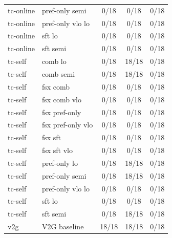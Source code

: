 \documentclass[10pt,landscape]{article}
\begin{document}
\begin{tabular}{llccc}
tc-online & pref-only semi & \cellcolor{missing}0/18 & \cellcolor{missing}0/18 & \cellcolor{missing}0/18 \\
tc-online & pref-only vlo lo & \cellcolor{missing}0/18 & \cellcolor{missing}0/18 & \cellcolor{missing}0/18 \\
tc-online & sft lo & \cellcolor{missing}0/18 & \cellcolor{missing}0/18 & \cellcolor{missing}0/18 \\
tc-online & sft semi & \cellcolor{missing}0/18 & \cellcolor{missing}0/18 & \cellcolor{missing}0/18 \\
tc-self & comb lo & \cellcolor{missing}0/18 & \cellcolor{done}18/18 & \cellcolor{missing}0/18 \\
tc-self & comb semi & \cellcolor{missing}0/18 & \cellcolor{done}18/18 & \cellcolor{missing}0/18 \\
tc-self & fsx comb & \cellcolor{missing}0/18 & \cellcolor{missing}0/18 & \cellcolor{missing}0/18 \\
tc-self & fsx comb vlo & \cellcolor{missing}0/18 & \cellcolor{missing}0/18 & \cellcolor{missing}0/18 \\
tc-self & fsx pref-only & \cellcolor{missing}0/18 & \cellcolor{missing}0/18 & \cellcolor{missing}0/18 \\
tc-self & fsx pref-only vlo & \cellcolor{missing}0/18 & \cellcolor{missing}0/18 & \cellcolor{missing}0/18 \\
tc-self & fsx sft & \cellcolor{missing}0/18 & \cellcolor{missing}0/18 & \cellcolor{missing}0/18 \\
tc-self & fsx sft vlo & \cellcolor{missing}0/18 & \cellcolor{missing}0/18 & \cellcolor{missing}0/18 \\
tc-self & pref-only lo & \cellcolor{missing}0/18 & \cellcolor{done}18/18 & \cellcolor{missing}0/18 \\
tc-self & pref-only semi & \cellcolor{missing}0/18 & \cellcolor{done}18/18 & \cellcolor{missing}0/18 \\
tc-self & pref-only vlo lo & \cellcolor{missing}0/18 & \cellcolor{missing}0/18 & \cellcolor{missing}0/18 \\
tc-self & sft lo & \cellcolor{missing}0/18 & \cellcolor{missing}0/18 & \cellcolor{missing}0/18 \\
tc-self & sft semi & \cellcolor{missing}0/18 & \cellcolor{done}18/18 & \cellcolor{missing}0/18 \\
v2g & V2G baseline & \cellcolor{done}18/18 & \cellcolor{done}18/18 & \cellcolor{missing}0/18 \\
\bottomrule
\end{tabular}
\vspace{1em}
\end{document}

